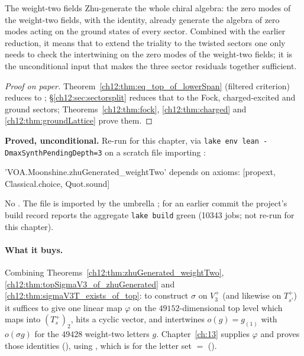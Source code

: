 \begin{physics}
The weight-two fields Zhu-generate the whole chiral algebra: the zero modes of the weight-two fields, with the identity, already generate the algebra of zero modes acting on the ground states of every sector. Combined with the earlier reduction, it means that to extend the triality to the twisted sectors one only needs to check the intertwining on the zero modes of the weight-two fields; it is the unconditional input that makes the three sector residuals together sufficient.
\end{physics}
\begin{proof}[Proof on paper]
Theorem~\ref{ch12:thm:eq_top_of_lowerSpan} (filtered criterion) reduces to ;
\S\ref{ch12:sec:sectorsplit} reduces that to the Fock, charged-excited and ground sectors;
Theorems~\ref{ch12:thm:fock}, \ref{ch12:thm:charged} and \ref{ch12:thm:groundLattice} prove them.
\end{proof}
\begin{status}
\textbf{Proved, unconditional.}  Re-run for this chapter, via \texttt{lake env lean
-DmaxSynthPendingDepth=3} on a scratch file importing :
\begin{plaincode}
'VOA.Moonshine.zhuGenerated_weightTwo' depends on axioms: [propext, Classical.choice, Quot.sound]
\end{plaincode}
No .  The file is imported by the umbrella ; for an earlier
commit the project's build record reports the aggregate \texttt{lake build} green (10343 jobs; not re-run for this chapter).
\end{status}

\paragraph{What it buys.}  Combining Theorems~\ref{ch12:thm:zhuGenerated_weightTwo},
\ref{ch12:thm:topSigmaV3_of_zhuGenerated} and \ref{ch12:thm:sigmaV3T_exists_of_top}: to construct $\sigma$ on
$V_3^+$ (and likewise on $T_{s'}^+$) it suffices to give one linear map $\varphi$ on the
$49152$-dimensional top level which maps into $(T_s^+)_2$, hits a cyclic vector, and intertwines
$o(g)=g_{(1)}$ with $o(\sigma g)$ for the $49428$ weight-two letters $g$.  Chapter~\ref{ch:13} supplies
$\varphi$ and proves those identities (), using , which is
 for the letter set  $=$  ().

